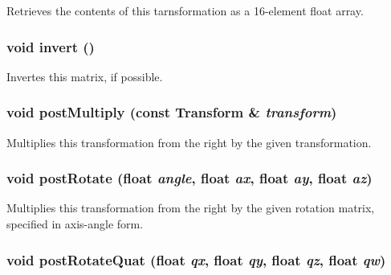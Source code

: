 Retrieves the contents of this tarnsformation as a 16-element float array. \hypertarget{classm3g_1_1Transform_7fa1616cc61c19a5efcc863c950f7f30}{
\subsubsection[{invert}]{\setlength{\rightskip}{0pt plus 5cm}void invert ()}}
\label{classm3g_1_1Transform_7fa1616cc61c19a5efcc863c950f7f30}


Invertes this matrix, if possible. \hypertarget{classm3g_1_1Transform_ad6083d90dbecc7e5bb39d5062723a0d}{
\subsubsection[{postMultiply}]{\setlength{\rightskip}{0pt plus 5cm}void postMultiply (const {\bf Transform} \& {\em transform})}}
\label{classm3g_1_1Transform_ad6083d90dbecc7e5bb39d5062723a0d}


Multiplies this transformation from the right by the given transformation. \hypertarget{classm3g_1_1Transform_4abf135257f132cdf9580f3a3e11ea6c}{
\subsubsection[{postRotate}]{\setlength{\rightskip}{0pt plus 5cm}void postRotate (float {\em angle}, \/  float {\em ax}, \/  float {\em ay}, \/  float {\em az})}}
\label{classm3g_1_1Transform_4abf135257f132cdf9580f3a3e11ea6c}


Multiplies this transformation from the right by the given rotation matrix, specified in axis-angle form. \hypertarget{classm3g_1_1Transform_7ce6ca00ac17bc4bb5f271c48da5e2dc}{
\subsubsection[{postRotateQuat}]{\setlength{\rightskip}{0pt plus 5cm}void postRotateQuat (float {\em qx}, \/  float {\em qy}, \/  float {\em qz}, \/  float {\em qw})}}
\label{classm3g_1_1Transform_7ce6ca00ac17bc4bb5f271c48da5e2dc}


